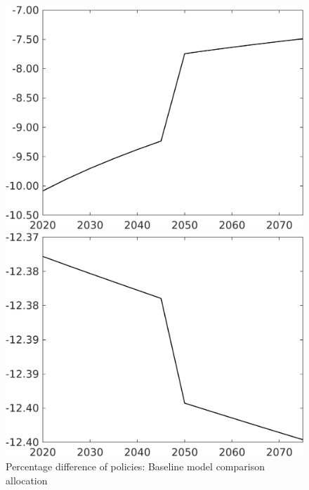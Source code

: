 \documentclass[12pt]{article}
\begin{document}
\begin{figure}[h!!]
	\centering
	\caption{Percentage difference of policies: Baseline model comparison allocation}\label{fig:Pertauf_nsk0_xgr1_notaul}
	\begin{minipage}[]{0.32\textwidth}
		\includegraphics[width=1\textwidth]{../../codding_model/own_basedOnFried/optimalPol_010922_revision/figures/all_13Sept22/CompTaufPER_bytaul_Reg0_tauf_spillover0_nsk0_xgr1_knspil0_sep0_LFlimit1_emsbase0_countec0_GovRev0_etaa0.79_lgd0.png}
	\end{minipage}		
	\begin{minipage}[]{0.32\textwidth}
		\includegraphics[width=1\textwidth]{../../codding_model/own_basedOnFried/optimalPol_010922_revision/figures/all_13Sept22/CompTaufPER_bytaul_Reg0_hh_spillover0_nsk0_xgr1_knspil0_sep0_LFlimit1_emsbase0_countec0_GovRev0_etaa0.79_lgd0.png}

\end{minipage}
\end{figure}
\end{document}
